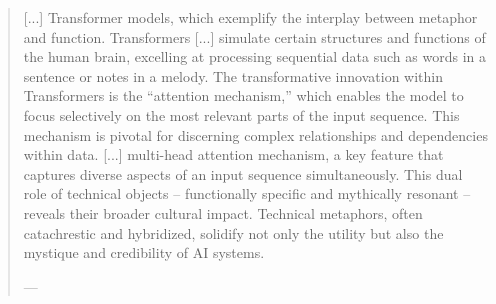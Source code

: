 \begin{quote}
	[...] Transformer models, which exemplify the interplay between metaphor and function. Transformers [...] simulate certain structures and functions of the human brain, excelling at processing sequential data such as words in a sentence or notes in a melody. The transformative innovation within Transformers is the “attention mechanism,” which enables the model to focus selectively on the most relevant parts of the input sequence. This mechanism is pivotal for discerning complex relationships and dependencies within data. [...] multi-head attention mechanism, a key feature that captures diverse aspects of an input sequence simultaneously. This dual role of technical objects – functionally specific and mythically resonant – reveals their broader cultural impact. Technical metaphors, often catachrestic and hybridized, solidify not only the utility but also the mystique and credibility of AI systems.

	— \parencite[206]{montanari2025}
\end{quote}







